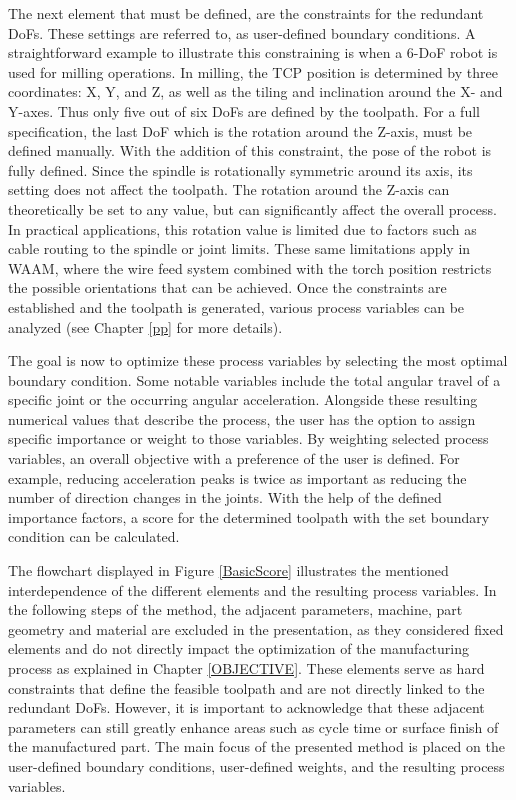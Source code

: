 The next element that must be defined, are the constraints for the redundant \acrshort{DoF}s. These settings are referred to, as user-defined boundary conditions. A straightforward example to illustrate this constraining is when a 6-\acrshort{DoF} robot is used for milling operations. In milling, the \acrshort{TCP} position is determined by three coordinates: X, Y, and Z, as well as the tiling and inclination around the X- and Y-axes. Thus only five out of six \acrshort{DoF}s are defined by the toolpath. For a full specification, the last \acrshort{DoF} which is the rotation around the Z-axis, must be defined manually. With the addition of this constraint, the pose of the robot is fully defined. Since the spindle is rotationally symmetric around its axis, its setting does not affect the toolpath. The rotation around the Z-axis can theoretically be set to any value, but can significantly affect the overall process. In practical applications, this rotation value is limited due to factors such as cable routing to the spindle or joint limits. These same limitations apply in \acrshort{WAAM}, where the wire feed system combined with the torch position restricts the possible orientations that can be achieved. Once the constraints are established and the toolpath is generated, various process variables can be analyzed (see Chapter \ref{pp} for more details). 

The goal is now to optimize these process variables by selecting the most optimal boundary condition. Some notable variables include the total angular travel of a specific joint or the occurring angular acceleration. Alongside these resulting numerical values that describe the process, the user has the option to assign specific importance or weight to those variables. By weighting selected process variables, an overall objective with a preference of the user is defined. For example, reducing acceleration peaks is twice as important as reducing the number of direction changes in the joints. With the help of the defined importance factors, a score for the determined toolpath with the set boundary condition can be calculated.

The flowchart displayed in Figure \ref{BasicScore} illustrates the mentioned interdependence of the different elements and the resulting process variables.
In the following steps of the method, the adjacent parameters, machine, part geometry and material are excluded in the presentation, as they considered fixed elements and do not directly impact the optimization of the manufacturing process as explained in Chapter \ref{OBJECTIVE}. These elements serve as hard constraints that define the feasible toolpath and are not directly linked to the redundant \acrshort{DoF}s. However, it is important to acknowledge that these adjacent parameters can still greatly enhance areas such as cycle time or surface finish of the manufactured part. The main focus of the presented method is placed on the user-defined boundary conditions, user-defined weights, and the resulting process variables.


